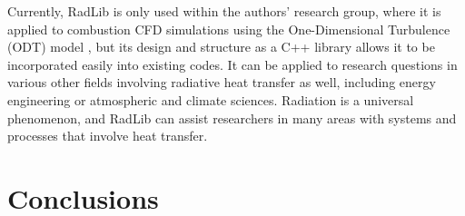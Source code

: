\documentclass[preprint,12pt]{elsarticle}
\begin{document}
Currently, RadLib is only used within the authors' research group, where it is applied to combustion CFD simulations using the One-Dimensional Turbulence (ODT) model \cite{Stephens_2020}, but its design and structure as a C++ library allows it to be incorporated easily into existing codes. It can be applied to  research questions in various other fields involving radiative heat transfer as well, including energy engineering or atmospheric and climate sciences. Radiation is a universal phenomenon, and RadLib can assist researchers in many areas with systems and processes that involve heat transfer. 



\section{Conclusions} \label{s:conclusions}
\end{document}
